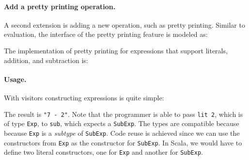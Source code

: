 \paragraph{Add a pretty printing operation.}
A second extension is adding a new operation, such as pretty printing.
Similar to evaluation, the interface of the pretty printing feature
is modeled as:
\begin{comment}
  \begin{lstlisting}{language=F2J}
    type IPrint = {print : String};
  \end{lstlisting}
\end{comment}
The implementation of pretty printing for expressions that support literals,
addition, and subtraction is:
\begin{comment}
  \begin{lstlisting}{language=F2J}
    let printAlg : SubExpAlg[IPrint] = {
      lit = \(x: Int) -> {print = x.toString()},
      add = \(x: IPrint) (y: IPrint) -> {
        print = x.print ++ " + " ++ y.print
      },
      sub = \(x: IPrint) (y: IPrint) -> {
        print = x.print ++ " - " ++ y.print
      }
    };
  \end{lstlisting}
\end{comment}

\paragraph{Usage.} With visitors constructing expressions is quite simple:

\begin{comment}
  \begin{lstlisting}{language=F2J}
    e2 = sub (lit 7) (lit 2)
  \end{lstlisting}
\end{comment}
The result is \lstinline$"7 - 2"$. Note that the programmer is able to pass \lstinline{lit 2}, which is of type \lstinline{Exp},
to \lstinline{sub}, which expects a \lstinline{SubExp}. The types are compatible
because because \lstinline$Exp$ is a \emph{subtype} of \lstinline$SubExp$. Code
reuse is achieved since we can use the constructors from \lstinline$Exp$ as the
constructor for \lstinline$SubExp$. In Scala, we would have to define two
literal constructors, one for \lstinline$Exp$ and another for
\lstinline$SubExp$.

